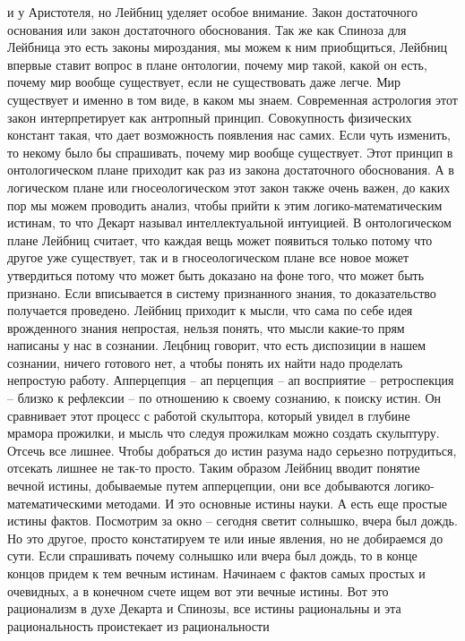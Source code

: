 \documentclass[a4paper, 12pt]{article}
\begin{document}
и у Аристотеля, но Лейбниц уделяет особое внимание. Закон достаточного 
основания или закон достаточного обоснования. Так же как Спиноза для 
Лейбница это есть законы мироздания, мы можем к ним приобщиться, Лейбниц 
впервые ставит вопрос в плане онтологии, почему мир такой, какой он 
есть, почему мир вообще существует, если не существовать даже легче. Мир 
существует и именно в том виде, в каком мы знаем. Современная астрология 
этот закон интерпретирует как антропный принцип. Совокупность физических 
констант такая, что дает возможность появления нас самих. Если чуть 
изменить, то некому было бы спрашивать, почему мир вообще существует. 
Этот принцип в онтологическом плане приходит как раз из закона 
достаточного обоснования. А в логическом плане или гносеологическом этот 
закон также очень важен, до каких пор мы можем проводить анализ, чтобы 
прийти к этим логико-математическим истинам, то что Декарт называл 
интеллектуальной интуицией. В онтологическом плане Лейбниц считает, что 
каждая вещь может появиться только потому что другое уже существует, так 
и в гносеологическом плане все новое может утвердиться потому что может 
быть доказано на фоне того, что может быть признано. Если вписывается 
в систему признанного знания, то доказательство получается проведено. 
Лейбниц приходит к мысли, что сама по себе идея врожденного знания 
непростая, нельзя понять, что мысли какие-то прям написаны у нас 
в сознании. Лецбниц говорит, что есть диспозиции в нашем сознании, 
ничего готового нет, а чтобы понять их найти надо проделать непростую 
работу. Апперцепция -- ап перцепция -- ап восприятие -- ретроспекция -- 
близко к рефлексии -- по отношению к своему сознанию, к поиску истин. Он 
сравнивает этот процесс с работой скульптора, который увидел в глубине 
мрамора прожилки, и мысль что следуя прожилкам можно создать скульптуру. 
Отсечь все лишнее. Чтобы добраться до истин разума надо серьезно 
потрудиться, отсекать лишнее не так-то просто. Таким образом Лейбниц 
вводит понятие вечной истины, добываемые путем апперцепции, они все 
добываются логико-математическими методами. И это основные истины науки. 
А есть еще простые истины фактов. Посмотрим за окно -- сегодня светит 
солнышко, вчера был дождь. Но это другое, просто констатируем те или 
иные явления, но не добираемся до сути. Если спрашивать почему солнышко 
или вчера был дождь, то в конце концов придем к тем вечным истинам. 
Начинаем с фактов самых простых и очевидных, а в конечном счете ищем вот 
эти вечные истины. Вот это рационализм в духе Декарта и Спинозы, все 
истины рациональны и эта рациональность проистекает из рациональности 
\end{document}
